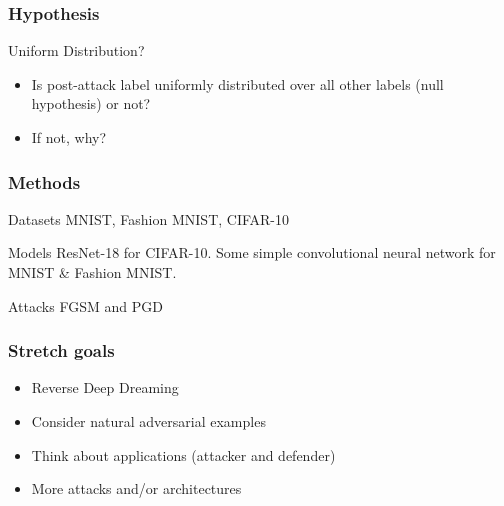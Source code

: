 \documentclass[10pt,usepdftitle=false,aspectratio=169]{beamer}
\begin{document}
\begin{frame}[fragile]
	\frametitle{Hypothesis}
			\begin{block}{Uniform Distribution?}
				\begin{itemize}
					\item Is post-attack label uniformly distributed over all other labels (null hypothesis) or not?
					\item If not, why?
				\end{itemize}
			\end{block}
\end{frame}

\begin{frame}[fragile]
	\frametitle{Methods}
		\begin{block}{Datasets}
			MNIST, Fashion MNIST, CIFAR-10
		\end{block}
		\begin{block}{Models}
			ResNet-18 for CIFAR-10.
			Some simple convolutional neural network for MNIST \& Fashion MNIST.
		\end{block}
		\begin{alertblock}{Attacks}
			FGSM and PGD
		\end{alertblock}

\end{frame}

\begin{frame}[fragile]
	\frametitle{Stretch goals}
	\begin{itemize}
		\item Reverse Deep Dreaming
		\item Consider natural adversarial examples
		\item Think about applications (attacker and defender)
		\item More attacks and/or architectures
	\end{itemize}
\end{frame}
\end{document}
